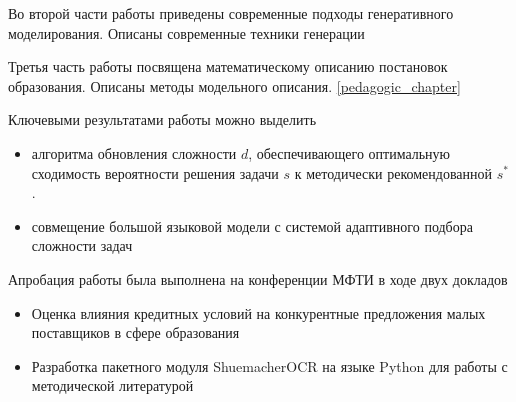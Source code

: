 Во второй части работы приведены современные подходы генеративного моделирования. Описаны современные техники генерации


Третья часть работы посвящена математическому описанию постановок образования. Описаны методы модельного описания. \ref{pedagogic_chapter}


Ключевыми результатами работы можно выделить \begin{itemize}
    \item алгоритма обновления сложности $d$, обеспечивающего оптимальную сходимость вероятности решения задачи $s$ к методически рекомендованной $s^*$.
    \item совмещение большой языковой модели с системой адаптивного подбора сложности задач
\end{itemize}

Апробация работы была выполнена на конференции МФТИ в ходе двух докладов \begin{itemize}
    \item Оценка влияния кредитных условий на конкурентные предложения малых поставщиков в сфере образования
    \item Разработка пакетного модуля ShuemacherOCR на языке Python для работы с методической литературой    
\end{itemize}
